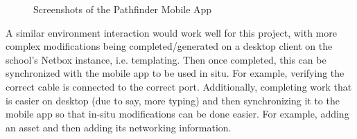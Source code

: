 \documentclass [11pt,a4paper]{article}
\begin{document}
\begin{figure}[H]
    \centering
    \qquad
    \caption{Screenshots of the Pathfinder Mobile App}
    \label{fig:pathfinder_screenshots}
\end{figure}

A similar environment interaction would work well for this project, with more complex modifications being completed/generated on a desktop client on the school's Netbox instance, i.e. templating. Then once completed, this can be synchronized with the mobile app to be used in situ. For example, verifying the correct cable is connected to the correct port. Additionally, completing work that is easier on desktop (due to say, more typing) and then synchronizing it to the mobile app so that in-situ modifications can be done easier. For example, adding an asset and then adding its networking information.  
\end{document}
